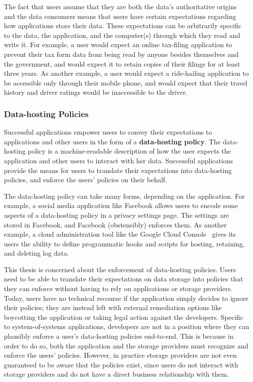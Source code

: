 The fact that users assume that they are both
the data's authoritative origins and the data consumers
means that users have certain expectations regarding how applications store
their data.  These expectations can be arbitrarily specific to the data, the application, and the
computer(s) through which they read and write it.  For example, a user would
expect an online tax-filing application to prevent their tax form data from being read by anyone
besides themselves and the government, and would expect it to retain copies of their 
filings for at least three years.  As another example, a user would expect a
ride-hailing application to be accessible only through their mobile phone, and
would expect that their travel history and driver ratings would be inaccessible
to the driver.

\subsubsection{Data-hosting Policies}

Successful applications empower users to convey their expectations to
applications and other users in the form of a \textbf{data-hosting policy}.
The data-hosting policy is a machine-readable
description of how the user expects the application and other users to interact
with her data.  Successful applications provide the means for users to translate their
expectations into data-hosting policies, and enforce the users'
policies on their behalf.

The data-hosting policy can take many forms, depending on the application.
For example, a social media application like Facebook allows
users to encode some aspects of a data-hosting policy in a privacy settings page.
The settings are stored in Facebook, and Facebook (obstensibly) enforces them.
As another example, a cloud administration tool like the Google Cloud
Console~\cite{google-cloud} gives its users the ability to define programmatic
hooks and scripts for hosting, retaining, and deleting log data.

This thesis is concerned about the enforcement of data-hosting policies.
Users need to be able to translate their expectations on data storage into
policies that they can enforce without having to rely on applications or storage
providers.  Today, users have no technical recourse if the application
simply decides to ignore their policies; they are instead left with external
remediation options like boycotting the application or taking legal action
against the developers.  Specific to system-of-systems applications,
developers are not in a position where they can plausibly enforce a user's data-hosting
policies end-to-end.  This is because in order to do so, 
both the application and the storage
providers must recognize and enforce the users' policies.  However, in practice storage
providers are not even guaranteed to be aware that the policies exist,
since users do not interact with storage providers and do not have a direct business
relationship with them.


